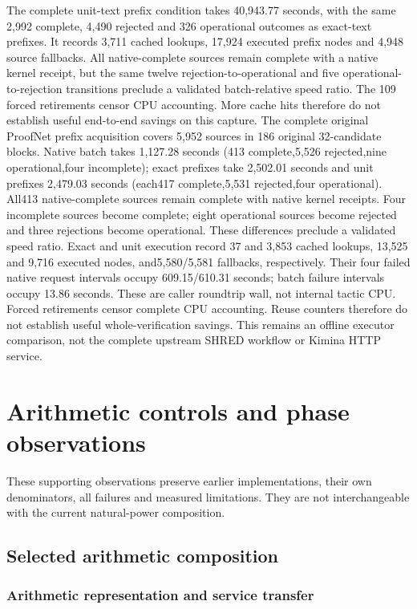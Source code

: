 \documentclass[10pt,twocolumn]{article}
\begin{document}
The complete unit-text prefix condition takes 40,943.77 seconds, with the
same 2,992 complete, 4,490 rejected and 326 operational outcomes as exact-text
prefixes. It records 3,711 cached lookups, 17,924 executed prefix nodes and
4,948 source fallbacks. All native-complete sources remain complete with a
native kernel receipt, but the same twelve rejection-to-operational and five
operational-to-rejection transitions preclude a validated batch-relative
speed ratio. The 109 forced retirements censor CPU accounting. More cache
hits therefore do not establish useful end-to-end savings on this capture.
The complete original ProofNet prefix acquisition covers 5,952 sources in
186 original 32-candidate blocks. Native batch takes 1,127.28 seconds
(413 complete,5,526 rejected,nine operational,four incomplete);
exact prefixes take 2,502.01 seconds and unit prefixes 2,479.03 seconds
(each417 complete,5,531 rejected,four operational).
All413 native-complete sources remain complete with native kernel receipts.
Four incomplete sources become complete; eight operational sources become
rejected and three rejections become operational. These differences preclude
a validated speed ratio. Exact and unit execution record 37 and 3,853 cached
lookups, 13,525 and 9,716 executed nodes, and5,580/5,581 fallbacks, respectively.
Their four failed native request intervals occupy 609.15/610.31 seconds;
batch failure intervals occupy 13.86 seconds. These are caller roundtrip wall,
not internal tactic CPU. Forced retirements censor complete CPU accounting.
Reuse counters therefore do not establish useful whole-verification savings.
This remains an offline executor comparison, not the complete upstream SHRED workflow
or Kimina HTTP service.

\section{Arithmetic controls and phase observations}\label{app:arithmetic-history}
These supporting observations preserve earlier implementations, their own denominators, all failures and measured limitations. They are not interchangeable with the current natural-power composition.

\subsection{Selected arithmetic composition}\label{app:selected-arithmetic-composition}

\subsubsection{Arithmetic representation and service transfer}
\end{document}

